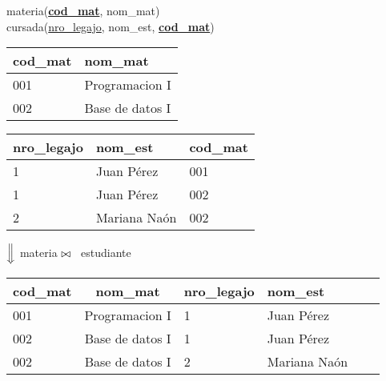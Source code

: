 \documentclass[preview]{standalone}
\begin{document}
materia(\underline{\textbf{cod\_mat}}, nom\_mat)\\
cursada(\underline{nro\_legajo}, nom\_est, \underline{\textbf{cod\_mat}})\\

\begin{center}
\begin{tabular}{| l | l | }\hline			
	\textbf{cod\_mat} & nom\_mat \\\hline			
	001 & Programacion I \\
	002 & Base de datos I \\\hline
\end{tabular}
\quad
\begin{tabular}{| l | l | l | }\hline			
	nro\_legajo & nom\_est & \textbf{cod\_mat} \\\hline			
	1 & Juan P\'erez & 001\\
	1 & Juan P\'erez & 002\\
	2 & Mariana Na\'on & 002 \\\hline
\end{tabular}
\vspace{.35cm}

$\Big\Downarrow$ materia ${\Large\bowtie}$ \ estudiante 
\vspace{.35cm}

\begin{tabular}{| l | c | l | l | l | l }\hline			
	\textbf{cod\_mat} & nom\_mat & nro\_legajo & nom\_est \\\hline			
	001 & Programacion I & 1 & Juan P\'erez  \\
	002 & Base de datos I & 1 & Juan P\'erez \\
	002 & Base de datos I & 2 & Mariana Na\'on \\\hline
\end{tabular}
\end{center}
\end{document}
